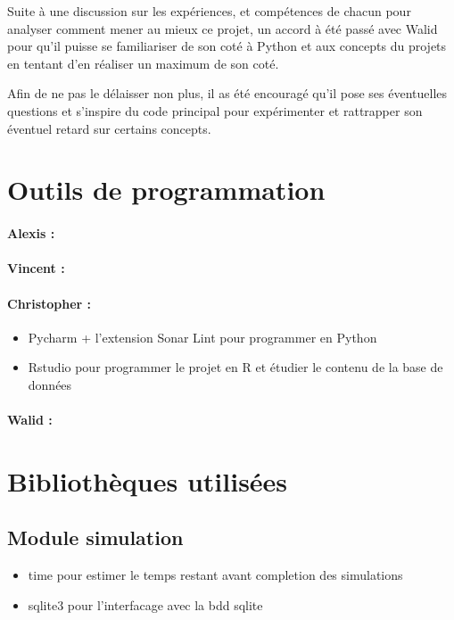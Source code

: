 \documentclass[
	headsepline=on,
	footsepline=on,
	twoside=off,
	abstract=on,
	DIV=10
]{scrreprt}
\begin{document}
		Suite à une discussion sur les expériences, et compétences de chacun pour analyser comment mener au mieux ce projet, un accord à été passé avec Walid pour qu'il puisse se familiariser de son coté à Python et aux concepts du projets en tentant d'en réaliser un maximum de son coté.
		
		Afin de ne pas le délaisser non plus, il as été encouragé qu'il pose ses éventuelles questions et s'inspire du code principal pour expérimenter et rattrapper son éventuel retard sur certains concepts.
		
		
			\section{Outils de programmation}
				\paragraph{Alexis :}
				\paragraph{Vincent :}
			
				\paragraph{Christopher :}
				\begin{itemize}
					\item Pycharm + l'extension Sonar Lint pour programmer en Python
					\item Rstudio pour programmer le projet en R et étudier le contenu de la base de données
				\end{itemize}
				\paragraph{Walid :}
			
			\section{Bibliothèques utilisées}
				\subsection{Module simulation}
				
				\begin{itemize}
					\item time pour estimer le temps restant avant completion des simulations
					\item sqlite3 pour l'interfacage avec la bdd sqlite
				\end{itemize}
			
\end{document}
